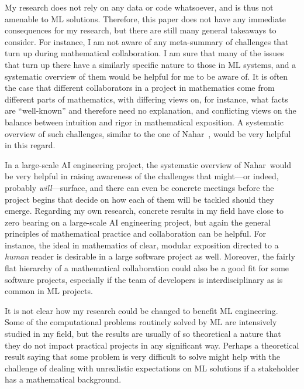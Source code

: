 My research does not rely on any data or code whatsoever, and is thus not amenable to ML solutions. Therefore, this paper does not have any immediate consequences for my research, but there are still many general takeaways to consider. For instance, I am not aware of any meta-summary of challenges that turn up during mathematical collaboration. I am sure that many of the issues that turn up there have a similarly specific nature to those in ML systems, and a systematic overview of them would be helpful for me to be aware of. It is often the case that different collaborators in a project in mathematics come from different parts of mathematics, with differing views on, for instance, what facts are ``well-known'' and therefore need no explanation, and conflicting views on the balance between intuition and rigor in mathematical exposition. A systematic overview of such challenges, similar to the one of Nahar~\etal, would be very helpful in this regard. 

In a large-scale AI engineering project, the systematic overview of Nahar~\etal would be very helpful in raising awareness of the challenges that might---or indeed, probably \emph{will}---surface, and there can even be concrete meetings before the project begins that decide on how each of them will be tackled should they emerge. Regarding my own research, concrete results in my field have close to zero bearing on a large-scale AI engineering project, but again the general principles of mathematical practice and collaboration can be helpful. For instance, the ideal in mathematics of clear, modular exposition directed to a \emph{human} reader is desirable in a large software project as well. Moreover, the fairly flat hierarchy of a mathematical collaboration could also be a good fit for some software projects, especially if the team of developers is interdisciplinary as is common in ML projects. 

It is not clear how my research could be changed to benefit ML engineering. Some of the computational problems routinely solved by ML are intensively studied in my field, but the results are usually of so theoretical a nature that they do not impact practical projects in any significant way. Perhaps a theoretical result saying that some problem is very difficult to solve might help with the challenge of dealing with unrealistic expectations on ML solutions if a stakeholder has a mathematical background.


